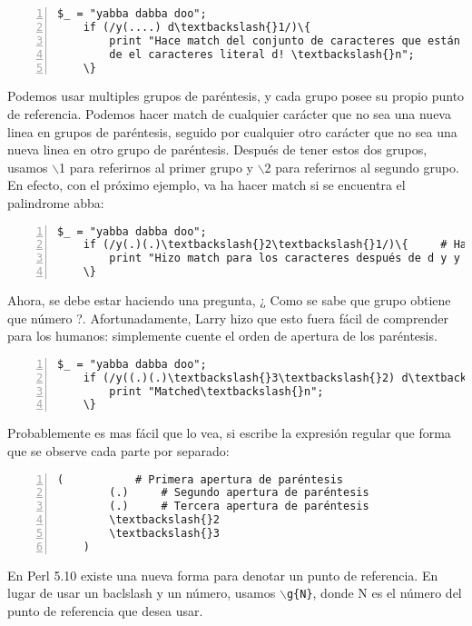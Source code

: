 \vspace{-6pt}
\small
\begin{Verbatim}[commandchars=\\\{\},numbers=left]
    $_ = "yabba dabba doo";
    if (/y(....) d\textbackslash{}1/)\{
        print "Hace match del conjunto de caracteres que están antes y después
        de el caracteres literal d! \textbackslash{}n";
    \}
\end{Verbatim}
\vspace{-6pt}
\normalsize
Podemos usar multiples grupos de paréntesis, y cada grupo posee su propio punto de referencia. Podemos hacer match de cualquier carácter que no sea una nueva linea en grupos de paréntesis, seguido por cualquier otro carácter que no sea una nueva linea en otro grupo de paréntesis. Después de tener estos dos grupos, usamos $\backslash$1 para referirnos al primer grupo y $\backslash$2 para referirnos al segundo grupo. En efecto, con el próximo ejemplo, va ha hacer match si se encuentra el palindrome abba:

\vspace{-6pt}
\small
\begin{Verbatim}[commandchars=\\\{\},numbers=left]
    $_ = "yabba dabba doo";
    if (/y(.)(.)\textbackslash{}2\textbackslash{}1/)\{     # Hace match de 'abba'
        print "Hizo match para los caracteres después de d y y \textbackslash{}n";
    \}
\end{Verbatim}
\vspace{-6pt}
\normalsize
Ahora, se debe estar haciendo una pregunta, ¿ Como se sabe que grupo obtiene que número ?. Afortunadamente, Larry hizo que esto fuera fácil de comprender para los humanos: simplemente cuente el orden de apertura de los paréntesis.

\vspace{-6pt}
\small
\begin{Verbatim}[commandchars=\\\{\},numbers=left]
    $_ = "yabba dabba doo";
    if (/y((.)(.)\textbackslash{}3\textbackslash{}2) d\textbackslash{}1/)\{
        print "Matched\textbackslash{}n";
    \}
\end{Verbatim}
\vspace{-6pt}
\normalsize
Probablemente es mas fácil que lo vea, si escribe la expresión regular que forma que se observe cada parte por separado:

\vspace{-6pt}
\small
\begin{Verbatim}[commandchars=\\\{\},numbers=left]
    (           # Primera apertura de paréntesis
        (.)     # Segundo apertura de paréntesis
        (.)     # Tercera apertura de paréntesis 
        \textbackslash{}2
        \textbackslash{}3
    )
\end{Verbatim}
\vspace{-6pt}
\normalsize
En Perl 5.10 existe una nueva forma para denotar un punto de referencia. En lugar de usar un baclslash y un número, usamos \texttt{$\backslash$g\{N\}}, donde N es el número del punto de referencia que desea usar.

